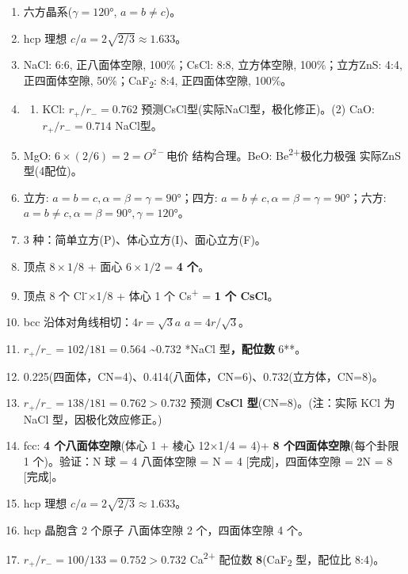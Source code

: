 \begin{enumerate}
\def\labelenumi{\arabic{enumi}.}
\item
  六方晶系(\(\gamma=120°\), \(a=b\neq c\))。
\item
  hcp 理想 \(c/a = 2\sqrt{2/3} \approx 1.633\)。
\item
  NaCl: 6:6, 正八面体空隙, 100\%；CsCl: 8:8, 立方体空隙, 100\%；立方ZnS: 4:4, 正四面体空隙, 50\%；CaF\textsubscript{2}: 8:4, 正四面体空隙, 100\%。
\item
  \begin{enumerate}
  \def\labelenumii{(\arabic{enumii})}
  \tightlist
  \item
    KCl: \(r_+/r_-=0.762\) \箭 预测CsCl型(实际NaCl型，极化修正)。(2) CaO: \(r_+/r_-=0.714\) \箭 NaCl型。
  \end{enumerate}
\item
  MgO: \(6\times(2/6)=2=O^{2-}\)电价 \箭 结构合理。BeO: Be\textsuperscript{2+}极化力极强 \箭 实际ZnS型(4配位)。
\item
  立方: \(a=b=c, \alpha=\beta=\gamma=90°\)；四方: \(a=b\neq c, \alpha=\beta=\gamma=90°\)；六方: \(a=b\neq c, \alpha=\beta=90°, \gamma=120°\)。
\item
  3 种：简单立方(P)、体心立方(I)、面心立方(F)。
\item
  顶点 \(8\times1/8\) + 面心 \(6\times1/2\) = \textbf{4 个}。
\item
  顶点 8 个 Cl\textsuperscript{-}×1/8 + 体心 1 个 Cs\textsuperscript{+} = \textbf{1 个 CsCl}。
\item
  bcc 沿体对角线相切：\(4r = \sqrt{3}a\) \箭 \(a = 4r/\sqrt{3}\)。
\item
  \(r_+/r_- = 102/181 = 0.564\) \textasciitilde0.732 \箭 **NaCl 型\textbf{，配位数 }6**。
\item
  0.225(四面体，CN=4)、0.414(八面体，CN=6)、0.732(立方体，CN=8)。
\item
  \(r_+/r_- = 138/181 = 0.762 > 0.732\) \箭 预测 \textbf{CsCl 型}(CN=8)。(注：实际 KCl 为 NaCl 型，因极化效应修正。)
\item
  fcc: \textbf{4 个八面体空隙}(体心 1 + 棱心 12×1/4 = 4)+ \textbf{8 个四面体空隙}(每个卦限 1 个)。验证：N 球 = 4 \箭 八面体空隙 = N = 4 {[}完成{]}，四面体空隙 = 2N = 8 {[}完成{]}。
\item
  hcp 理想 \(c/a = 2\sqrt{2/3} \approx 1.633\)。
\item
  hcp 晶胞含 2 个原子 \箭 八面体空隙 2 个，四面体空隙 4 个。
\item
  \(r_+/r_- = 100/133 = 0.752 > 0.732\) \箭 Ca\textsuperscript{2+} 配位数 \textbf{8}(CaF\textsubscript{2} 型，配位比 8:4)。

\end{enumerate}
